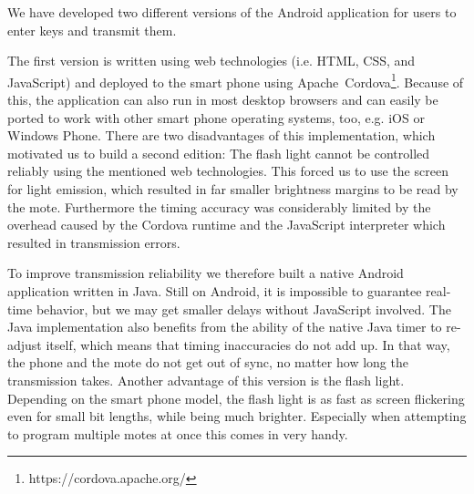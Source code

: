 \documentclass{sig-alternate} %
\begin{document}
We have developed two different versions of the Android application for users to enter keys and transmit them.


The first version is written using web technologies (i.e. HTML, CSS, and JavaScript) and deployed to the smart phone using Apache~Cordova\footnote{https://cordova.apache.org/}.
Because of this, the application can also run in most desktop browsers and can easily be ported to work with other smart phone operating systems, too, e.g. iOS or Windows Phone.
There are two disadvantages of this implementation, which motivated us to build a second edition:
The flash light cannot be controlled reliably using the mentioned web technologies.
This forced us to use the screen for light emission, which resulted in far smaller brightness margins to be read by the mote.
Furthermore the timing accuracy was considerably limited by the overhead caused by the Cordova runtime and the JavaScript interpreter which resulted in transmission errors.


To improve transmission reliability we therefore built a native Android application written in Java.
Still on Android, it is impossible to guarantee real-time behavior, but we may get smaller delays without JavaScript involved.
The Java implementation also benefits from the ability of the native Java timer to re-adjust itself, which means that timing inaccuracies do not add up.
In that way, the phone and the mote do not get out of sync, no matter how long the transmission takes.
Another advantage of this version is the flash light.
Depending on the smart phone model, the flash light is as fast as screen flickering even for small bit lengths, while being much brighter.
Especially when attempting to program multiple motes at once this comes in very handy.
\end{document}
